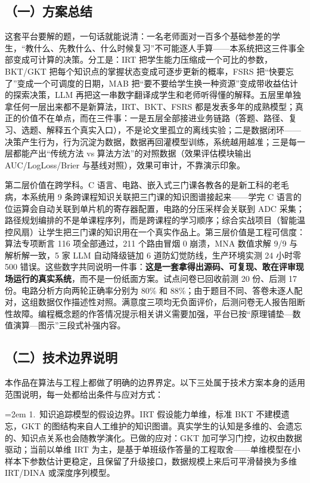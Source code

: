 \documentclass[zihao=-4,a4paper,UTF8,fontset=windows]{ctexart}
\begin{document}
\subsection{（一）方案总结}


这套平台要解的题，一句话就能说清：一名老师面对一百多个基础参差的学生，“教什么、先教什么、什么时候复习”不可能逐人手算——本系统把这三件事全部变成可计算的决策。分工是：IRT 把学生能力压缩成一个可比的参数，BKT/GKT 把每个知识点的掌握状态变成可逐步更新的概率，FSRS 把“快要忘了”变成一个可调度的日期，MAB 把“要不要给学生换一种资源”变成带收益估计的探索决策，LLM 再把这一串数字翻译成学生和老师听得懂的解释。五层里单独拿任何一层出来都不是新算法，IRT、BKT、FSRS 都是发表多年的成熟模型；真正的价值不在单点，而在三件事：一是五层全部接进业务链路（答题、路径、复习、选题、解释五个真实入口），不是论文里孤立的离线实验；二是数据闭环——决策产生行为，行为沉淀为数据，数据再回灌模型训练，系统越用越准；三是每一层都能产出“传统方法 vs 算法方法”的对照数据（效果评估模块输出 AUC/LogLoss/Brier 与基线对照），效果可审计，不靠演示印象。



第二层价值在跨学科。C 语言、电路、嵌入式三门课各教各的是新工科的老毛病，本系统用 9 条跨课程知识关联把三门课的知识图谱接起来——学完 C 语言的位运算会自动关联到单片机的寄存器配置，电路的分压采样会关联到 ADC 采集；路径规划编排的不是单课程序列，而是跨课程的学习顺序；综合实战项目（智能温控风扇）让学生把三门课的知识用在一个真实作品上。第三层价值是工程可信度：算法专项断言 116 项全部通过，211 个路由冒烟 0 崩溃，MNA 数值求解 9/9 与解析解一致，5 家 LLM 自动降级链加 6 道防幻觉防线，生产环境实测 24 小时零 500 错误。这些数字共同说明一件事：\textbf{这是一套拿得出源码、可复现、敢在评审现场运行的真实系统}，而不是一份纸面方案。试点问卷已回收前测 20 份、后测 17 份。电路分析方向两轮正确率分别为 80\% 和 88\%；由于题目不同、答卷未逐人配对，这组数据仅作描述性对照。满意度三项均无负面评价，后测问卷无人报告阻断性故障。编程概念题的作答情况提示相关讲义需要加强，平台已按“原理铺垫—数值演算—图示”三段式补强内容。

\subsection{（二）技术边界说明}


本作品在算法与工程上都做了明确的边界界定。以下三处属于技术方案本身的适用范围说明，每一处都给出条件与应对方式：

\noindent\hangindent=2em 1.~知识追踪模型的假设边界。IRT 假设能力单维，标准 BKT 不建模遗忘，GKT 的图结构来自人工维护的知识图谱。真实学生的认知是多维的、会遗忘的、知识点关系也会随教学演化。已做的应对：GKT 加可学习门控，边权由数据驱动；当前以单维 IRT 为主，是基于单班级作答量的工程取舍——单维模型在小样本下参数估计更稳定，且保留了升级接口，数据规模上来后可平滑替换为多维 IRT/DINA 或深度序列模型。
\end{document}
